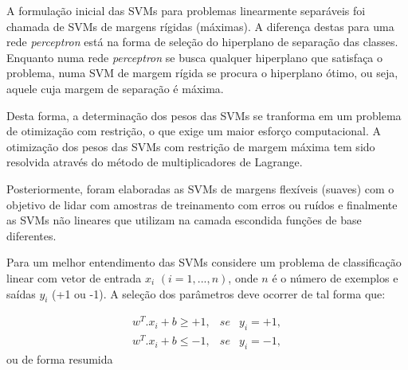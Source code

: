 A formulação inicial das SVMs para problemas linearmente separáveis foi chamada de SVMs de margens rígidas (máximas). A diferença destas para uma rede \textit{perceptron} está na forma de seleção do hiperplano de separação das classes. Enquanto numa rede \textit{perceptron} se busca qualquer hiperplano que satisfaça o problema, numa SVM de margem rígida se procura o hiperplano ótimo, ou seja, aquele cuja margem de separação é máxima.

Desta forma, a determinação dos pesos das SVMs se tranforma em um problema de otimização com restrição, o que exige um maior esforço computacional. A otimização dos pesos das SVMs com restrição de margem máxima tem sido resolvida através do método de multiplicadores de Lagrange.

Posteriormente, foram elaboradas as SVMs de margens flexíveis (suaves) com o objetivo de lidar com amostras de treinamento com erros ou ruídos e finalmente as SVMs não lineares que utilizam na camada escondida funções de base diferentes.

Para um melhor entendimento das SVMs considere um problema de classificação linear com vetor de entrada $x_i$ $(i=1,...,n)$, onde $n$ é o número de exemplos e saídas $y_i$ (+1 ou -1). A seleção dos parâmetros deve ocorrer de tal forma que:

\begin{eqnarray}
\label{eq:svm_example}
w^T.x_i + b \geq +1 ,& se& y_i= +1 , \\
w^T.x_i + b \leq -1 ,& se& y_i= -1 ,
\end{eqnarray}
ou de forma resumida

